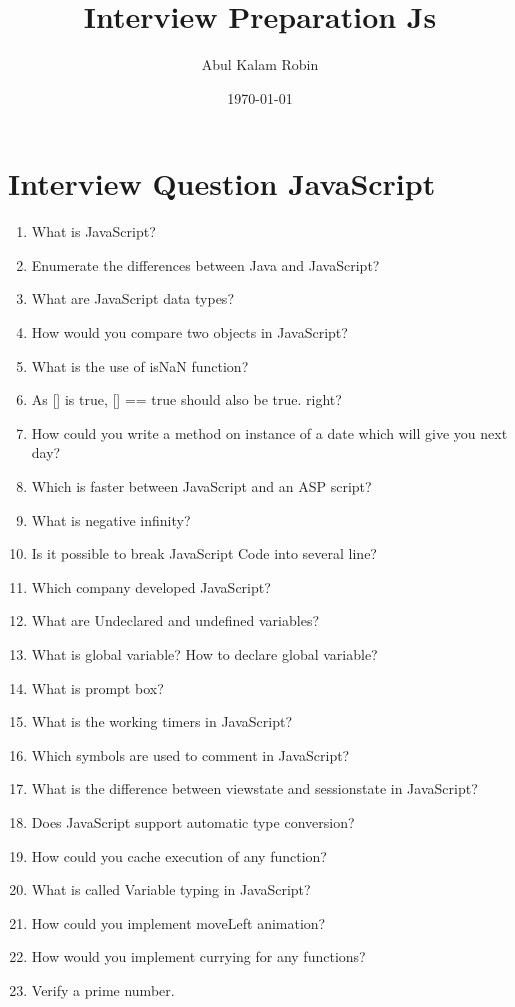 \documentclass[11pt]{article}
\author{Abul Kalam Robin}
\date{\today}
\title{Interview Preparation Js}
\begin{document}
\maketitle

\section*{Interview Question JavaScript}
\label{sec:org93f778f}
\begin{enumerate}
\item What is JavaScript?
\item Enumerate the differences between Java and JavaScript?
\item What are JavaScript data types?
\item How would you compare two objects in JavaScript?
\item What is the use of isNaN function?
\item As [] is true, [] == true should also be true. right?
\item How could you write a method on instance of a date which will give you next day?
\item Which is faster between JavaScript and an ASP script?
\item What is negative infinity?
\item Is it possible to break JavaScript Code into several line?
\item Which company developed JavaScript?
\item What are Undeclared and undefined variables?
\item What is global variable? How to declare global variable?
\item What is prompt box?
\item What is the working timers in JavaScript?
\item Which symbols are used to comment in JavaScript?
\item What is the difference between viewstate and sessionstate in JavaScript?
\item Does JavaScript support automatic type conversion?
\item How could you cache execution of any function?
\item What is called Variable typing in JavaScript?
\item How could you implement moveLeft animation?
\item How would you implement currying for any functions?
\item Verify a prime number.

\end{enumerate}
\end{document}
